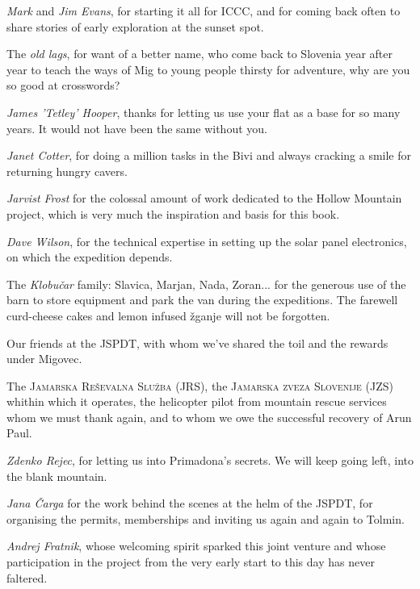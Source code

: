\begin{citemize}
\item \emph{Mark} and \emph{Jim Evans}, for starting it all for ICCC, and for coming back often to share stories of early exploration at the sunset spot.
\item The \emph{old lags}, for want of a better name, who come back to Slovenia year after year to teach the ways of Mig to young people thirsty for adventure, why are you so good at crosswords?
\item \emph{James 'Tetley' Hooper}, thanks for letting us use your flat as a base for so many years. It would not have been the same without you.
\item \emph{Janet Cotter}, for doing a million tasks in the Bivi and always cracking a smile for returning hungry cavers. 
\item \emph{Jarvist Frost} for the colossal amount of work dedicated to the Hollow Mountain project, which is very much the inspiration and basis for this book. 
\item \emph{Dave Wilson}, for the technical expertise in setting up the solar panel electronics, on which the expedition depends.

\item The \emph{Klobu\v{c}ar} family: Slavica, Marjan, Nada, Zoran... for the generous use of the barn to store equipment and park the van during the expeditions. The farewell curd-cheese cakes and lemon infused \v{z}ganje will not be forgotten.

\item Our friends at the JSPDT, with whom we've shared the toil and the rewards under Migovec.
\item The \textsc{Jamarska Re\v{s}evalna Slu\v{z}ba} (JRS), the \textsc{Jamarska zveza Slovenije} (JZS) whithin which it operates, the helicopter pilot from mountain rescue services whom we must thank again, and to whom we owe the successful recovery of Arun Paul.
\item \emph{Zdenko Rejec}, for letting us into Primadona's secrets. We will keep going left, into the blank mountain.
\item \emph{Jana \v{C}arga} for the work behind the scenes at the helm of the JSPDT, for organising the permits, memberships and inviting us again and again to Tolmin.
\item \emph{Andrej Fratnik}, whose welcoming spirit sparked this joint venture and whose participation in the project from the very early start to this day has never faltered. 
\end{citemize}
